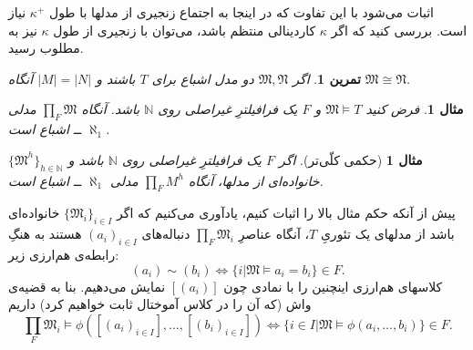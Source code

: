 \documentclass[12pt,a4paper]{report}
\theoremstyle{colorhead}
\newtheorem{tam}[thm]{تمرین}
\newtheorem{mesal}[thm]{مثال}
\begin{document}
اثبات می‌شود با این تفاوت که
در اینجا به اجتماع زنجیری از مدلها با طول
$\kappa^+$
نیاز است. بررسی کنید که اگر
$\kappa$
کاردینالی منتظم
 باشد، می‌توان با زنجیری از طول
$\kappa$
نیز به مطلوب رسید.
\begin{tam}
اگر
$\mathfrak{M},\mathfrak{N}$
دو مدل اشباع برای 
$T$
باشند و 
$|M|=|N|$
آنگاه 
$\mathfrak{M}\cong \mathfrak{N}$.
\end{tam}
\begin{mesal}
فرض کنید 
$\mathfrak{M}\models T$
و
$F$
یک فرافیلترِ غیراصلی روی
$\mathbb{N}$
باشد. آنگاه
$\prod_F \mathfrak{M}$
مدلی 
$\aleph_1$
ــ
اشباع است. 
\end{mesal}
\begin{mesal}[حکمی کلّی‌تر]
اگر
$F$
یک فرافیلترِ غیراصلی روی
$\mathbb{N}$
باشد و
$\{\mathfrak{M}^h\}_{h\in \mathbb{N}}$
خانواده‌ای از مدلها،‌ آنگاه
$\prod_F M^h$
مدلی
$\aleph_1$
ــ‌
اشباع است.
\end{mesal}
پیش از آنکه حکم مثال بالا را اثبات کنیم، یادآوری می‌کنیم که اگر
$\{\mathfrak{M}_i\}_{i\in I}$
خانواده‌ای باشد از مدلهای یک تئوریِ
$T$، 
آنگاه عناصرِ
$\prod_F \mathfrak{M}_i$
دنباله‌های
$(a_i)_{i\in I}$
هستند به هنگِ رابطه‌ی هم‌ارزی زیر:
\[
(a_i)\sim (b_i)\Leftrightarrow \{i|\mathfrak{M}\models a_i=b_i\}\in F.
\]
کلاسهای هم‌ارزی اینچنین را با نمادی چون
$[(a_i)]$
نمایش می‌دهیم.  بنا به قضیه‌ی واش
 (که آن را در کلاس آموختال ثابت خواهیم کرد) داریم
 \[
 \prod_F \mathfrak{M}_i\models \phi([(a_i)_{i\in I}],\ldots,[(b_i)_{i\in I}])\Leftrightarrow \{i\in I|\mathfrak{M}\models \phi(a_i,\ldots,b_i)\}\in F.
 \]
\end{document}
